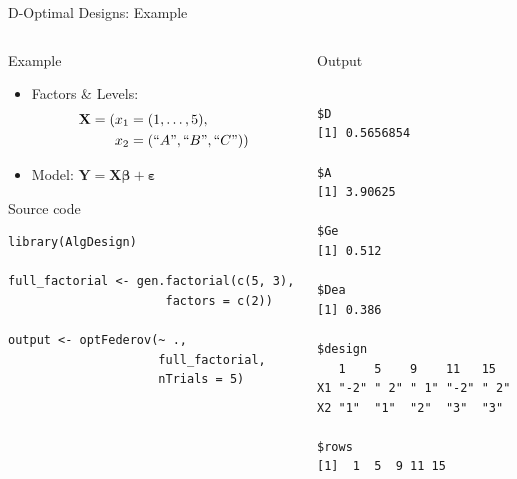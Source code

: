 \documentclass[10pt, compress, aspectratio=169, xcolor={table,usenames,dvipsnames}]{beamer}
\begin{document}
\begin{frame}[label={sec:org44dec91},fragile]{D-Optimal Designs: Example}
 \begin{columns}
\begin{column}{0.6\columnwidth}
\begin{block}{Example}
\begin{itemize}
\item Factors \& Levels:
\begin{align*}
\mathbf{X} = (x_1 = & \; (1, \dots, 5), \\
x_2 = & \; (``A", ``B", ``C"))
\end{align*}
\item Model: \(\mathbf{Y} = \mathbf{X}\bm{\beta} + \bm{\varepsilon}\)
\end{itemize}

\begin{block}{Source code}
\vspace{-.2cm}

\lstset{language=r,label= ,caption= ,captionpos=b,numbers=none}
\begin{lstlisting}
library(AlgDesign)

full_factorial <- gen.factorial(c(5, 3),
                      factors = c(2))

output <- optFederov(~ .,
                     full_factorial,
                     nTrials = 5)
\end{lstlisting}
\end{block}
\end{block}
\end{column}

\begin{column}{0.4\columnwidth}
\begin{block}{Output}
\vspace{-.2cm}
\scriptsize

\begin{verbatim}

$D
[1] 0.5656854

$A
[1] 3.90625

$Ge
[1] 0.512

$Dea
[1] 0.386

$design
   1    5    9    11   15
X1 "-2" " 2" " 1" "-2" " 2"
X2 "1"  "1"  "2"  "3"  "3"

$rows
[1]  1  5  9 11 15
\end{verbatim}


\normalsize
\end{block}
\end{column}
\end{columns}
\end{frame}
\end{document}
